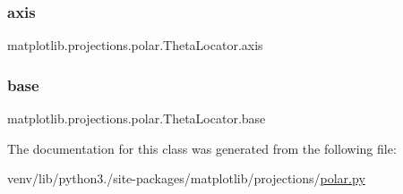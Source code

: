 \subsubsection{\texorpdfstring{axis}{axis}}
{\footnotesize\ttfamily matplotlib.\+projections.\+polar.\+Theta\+Locator.\+axis}

\mbox{\label{classmatplotlib_1_1projections_1_1polar_1_1ThetaLocator_adc5c8da0f90fd140394c459b7fbefe09}} 
\subsubsection{\texorpdfstring{base}{base}}
{\footnotesize\ttfamily matplotlib.\+projections.\+polar.\+Theta\+Locator.\+base}



The documentation for this class was generated from the following file\+:\begin{DoxyCompactItemize}
\item 
venv/lib/python3./site-\/packages/matplotlib/projections/\hyperlink{polar_8py}{polar.\+py}\end{DoxyCompactItemize}
